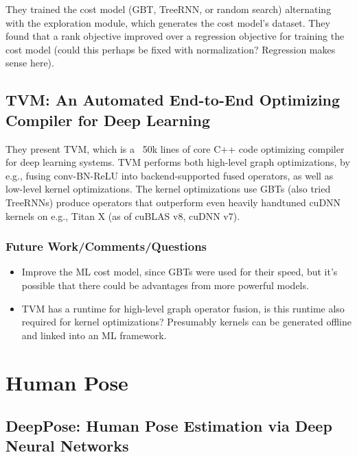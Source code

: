 \documentclass[a4paper, 12pt]{article}
\begin{document}
They trained the cost model (GBT, TreeRNN, or random search) alternating
with the exploration module, which generates the cost model's dataset. They
found that a rank objective improved over a regression objective for training
the cost model (could this perhaps be fixed with normalization? Regression
makes sense here).


\subsection{TVM: An Automated End-to-End Optimizing Compiler for Deep
            Learning~\cite{chen2018tvm}}

They present TVM, which is a ~50k lines of core C++ code optimizing compiler
for deep learning systems. TVM performs both high-level graph optimizations, by
e.g., fusing conv-BN-ReLU into backend-supported fused operators, as well as
low-level kernel optimizations. The kernel optimizations use GBTs (also tried
TreeRNNs) produce operators that outperform even heavily handtuned cuDNN
kernels on e.g., Titan X (as of cuBLAS v8, cuDNN v7).


\subsubsection{Future Work/Comments/Questions}

\begin{itemize}
        \item Improve the ML cost model, since GBTs were used for their speed,
                but it's possible that there could be advantages from more
                powerful models.

        \item TVM has a runtime for high-level graph operator fusion, is this
                runtime also required for kernel optimizations? Presumably
                kernels can be generated offline and linked into an ML
                framework.
\end{itemize}


\section{Human Pose}


\subsection{DeepPose: Human Pose Estimation via Deep Neural
            Networks\citet{DBLP:journals/corr/ToshevS13}}
\end{document}
